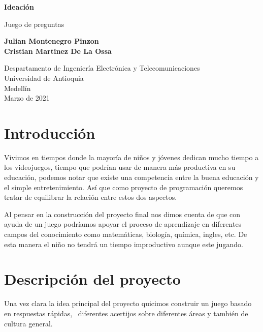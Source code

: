 \documentclass{article}
\begin{document}
\begin{titlepage}
    \begin{center}
        \vspace*{1cm}
            
        \Huge
        \textbf{Ideación}
            
        \vspace{0.5cm}
        \LARGE
        Juego de preguntas
            
        \vspace{1.5cm}
            
        \textbf{Julian Montenegro Pinzon}\\
        
        
        \textbf{Cristian Martinez De La Ossa}
        
            
        \vfill
            
        \vspace{0.8cm}
            
        \Large
        Despartamento de Ingeniería Electrónica y Telecomunicaciones\\
        Universidad de Antioquia\\
        Medellín\\
        Marzo de 2021
            
    \end{center}
\end{titlepage}

\tableofcontents
\newpage
\section{Introducción}\label{intro}
Vivimos en tiempos donde la mayoría de niños y jóvenes dedican mucho tiempo a los videojuegos, tiempo que podrían usar de manera más productiva en su educación, podemos notar que existe una competencia entre la buena educación y el simple entretenimiento. Así que como proyecto de programación queremos tratar de equilibrar la relación entre estos dos aspectos.

Al pensar en la construcción del proyecto final nos dimos cuenta de que con ayuda de un juego podríamos apoyar el proceso de aprendizaje en diferentes campos del conocimiento como matemáticas, biología, química, ingles, etc. De esta manera el niño no tendrá un tiempo improductivo aunque este jugando.

\section{Descripción del proyecto} \label{contenido}
Una vez clara la idea principal del proyecto quicimos construir un juego basado en respuestas rápidas,  diferentes acertijos sobre diferentes áreas y también de cultura general.
\end{document}
